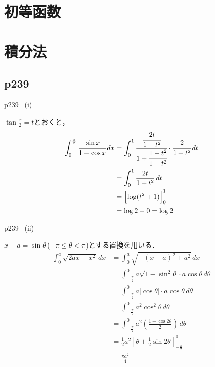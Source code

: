 \documentclass[dvipdfmx,uplatex,11pt]{jsarticle}
\begin{document}
\newpage

\section{初等函数}

\newpage

\section{積分法}


\subsection{p239}

\begin{screen}
	p239 \, (i) \par 
	 $\tan \frac{x}{2}=t$とおくと，
	\begin{align*}
		\int_{0}^{\frac{\pi}{2}} \cfrac{\sin x}{1+\cos x} \, dx & = \int_{0}^{1} \cfrac{\cfrac{2t}{1+t^2}}{1+\cfrac{1-t^2}{1+t^2}} \cdot \cfrac{2}{1+t^2} \, dt \\
		& = \int_{0}^{1} \frac{2t}{1+t^2} \, dt \\
		& = \Bigl[\log (t^2+1)\Bigl]_{0}^{1} \\
		& = \log 2-0 = \log 2
	\end{align*}
\end{screen}

\begin{screen}
	p239 \, (ii) \par
	  $x-a = \sin \theta$\,($ -\pi \le \theta < \pi$)とする置換を用いる．
	\begin{align*}
		\int_{0}^{a} \sqrt{2ax-x^2} \, dx & = \int_{0}^{a} \sqrt{-(x-a)^2+a^2} \, dx \\
		& = \int_{-\frac{\pi}{2}}^{0} a \sqrt{1-\sin ^2 \theta } \cdot a\cos \theta \, d \theta \\
		& = \int_{-\frac{\pi}{2}}^{0} a |\cos \theta| \cdot a\cos \theta \, d \theta \\
		& = \int_{-\frac{\pi}{2}}^{0} a^2 \cos^2 \theta \, d \theta \\
		& = \int_{-\frac{\pi}{2}}^{0} a^2 \left (\frac{1+\cos 2 \theta }{2}\right) \, d \theta \\
		& = \frac{1}{2} a^2 \left [\theta + \frac{1}{2}\sin 2 \theta \right ]_{-\frac{\pi}{2}}^{0} \\
		&= \frac{\pi a^2}{4}
	\end{align*}
\end{screen}
\end{document}
